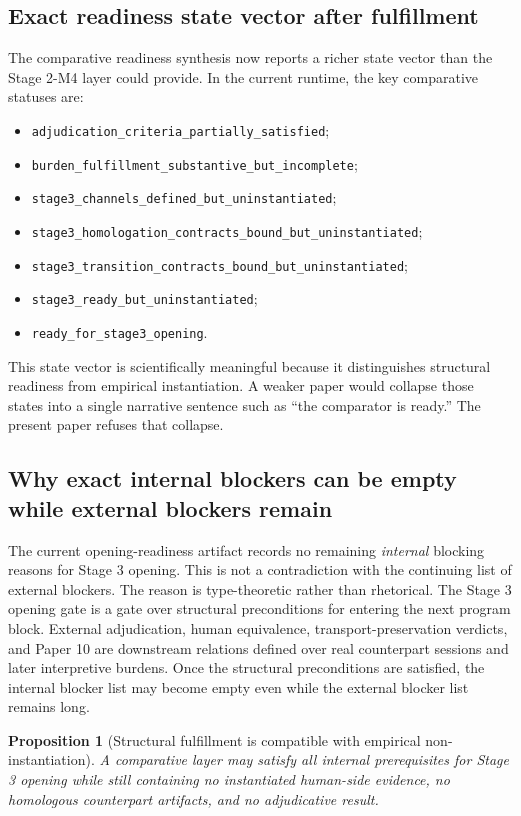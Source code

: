 \documentclass[11pt,a4paper]{article}
\newtheorem{proposition}[theorem]{Proposition}
\theoremstyle{definition}
\begin{document}
\subsection{Exact readiness state vector after fulfillment}
The comparative readiness synthesis now reports a richer state vector than the Stage 2-M4 layer could provide. In the current runtime, the key comparative statuses are:
\begin{itemize}[leftmargin=1.5em]
\item \texttt{adjudication\_criteria\_partially\_satisfied};
\item \texttt{burden\_fulfillment\_substantive\_but\_incomplete};
\item \texttt{stage3\_channels\_defined\_but\_uninstantiated};
\item \texttt{stage3\_homologation\_contracts\_bound\_but\_uninstantiated};
\item \texttt{stage3\_transition\_contracts\_bound\_but\_uninstantiated};
\item \texttt{stage3\_ready\_but\_uninstantiated};
\item \texttt{ready\_for\_stage3\_opening}.
\end{itemize}
This state vector is scientifically meaningful because it distinguishes structural readiness from empirical instantiation. A weaker paper would collapse those states into a single narrative sentence such as ``the comparator is ready.'' The present paper refuses that collapse.

\subsection{Why exact internal blockers can be empty while external blockers remain}
The current opening-readiness artifact records no remaining \emph{internal} blocking reasons for Stage 3 opening. This is not a contradiction with the continuing list of external blockers. The reason is type-theoretic rather than rhetorical. The Stage 3 opening gate is a gate over structural preconditions for entering the next program block. External adjudication, human equivalence, transport-preservation verdicts, and Paper 10 are downstream relations defined over real counterpart sessions and later interpretive burdens. Once the structural preconditions are satisfied, the internal blocker list may become empty even while the external blocker list remains long.

\begin{proposition}[Structural fulfillment is compatible with empirical non-instantiation]
A comparative layer may satisfy all internal prerequisites for Stage 3 opening while still containing no instantiated human-side evidence, no homologous counterpart artifacts, and no adjudicative result.
\end{proposition}
\end{document}
